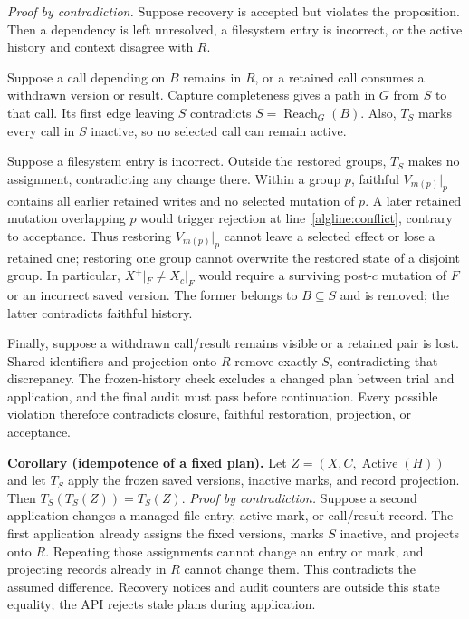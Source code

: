 \emph{Proof by contradiction.}
Suppose recovery is accepted but violates the proposition. Then a dependency
is left unresolved, a filesystem entry is incorrect, or the active history
and context disagree with $R$.

Suppose a call depending on $B$ remains in $R$, or a retained call consumes
a withdrawn version or result. Capture completeness gives a path in $G$
from $S$ to that call. Its first edge leaving $S$ contradicts
$S=\operatorname{Reach}_G(B)$. Also, $T_S$ marks every call in $S$
inactive, so no selected call can remain active.

Suppose a filesystem entry is incorrect. Outside the restored groups,
$T_S$ makes no assignment, contradicting any change there. Within a group
$p$, faithful $V_{m(p)}|_p$ contains all earlier retained writes and no
selected mutation of $p$. A later retained mutation overlapping $p$ would
trigger rejection at line~\ref{algline:conflict}, contrary to acceptance.
Thus restoring $V_{m(p)}|_p$ cannot leave a selected effect or lose a
retained one; restoring one group cannot overwrite the restored state of a
disjoint group.
In particular, $X^{+}|_F\ne X_c|_F$ would require a surviving post-$c$
mutation of $F$ or an incorrect saved version. The former belongs to
$B\subseteq S$ and is removed; the latter contradicts faithful history.

Finally, suppose a withdrawn call/result remains visible or a retained pair
is lost. Shared identifiers and projection onto $R$ remove exactly $S$,
contradicting that discrepancy. The frozen-history check excludes a changed
plan between trial and application, and the final audit must pass before
continuation. Every possible violation therefore contradicts closure,
faithful restoration, projection, or acceptance.

\textbf{Corollary (idempotence of a fixed plan).}
Let $Z=(X,C,\operatorname{Active}(H))$ and let $T_S$ apply the frozen
saved versions, inactive marks, and record projection. Then
$T_S(T_S(Z))=T_S(Z)$.
\emph{Proof by contradiction.} Suppose a second application changes a
managed file entry, active mark, or call/result record. The first application
already assigns the fixed versions, marks $S$ inactive, and projects onto
$R$. Repeating those assignments cannot change an entry or mark, and
projecting records already in $R$ cannot change them. This contradicts the
assumed difference. Recovery notices and audit counters are outside this
state equality; the API rejects stale plans during application.


